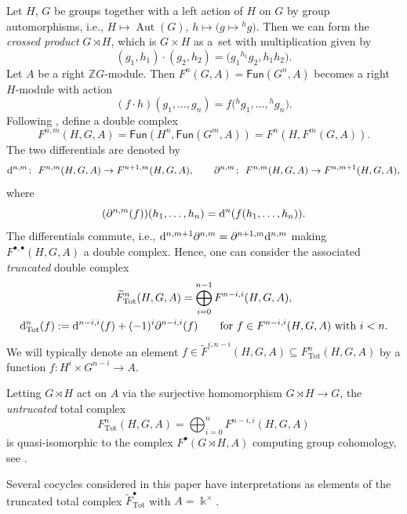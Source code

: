 \documentclass[pdftex]{sigma}
\numberwithin{equation}{section}
\newcommand{\Aut}{\operatorname{Aut}}
\newcommand{\deri}{{\rm d}}
\newcommand{\wF}{\widetilde{F}}
\newcommand{\Tot}{\mathrm{Tot}}
\newcommand{\Fun}{\mathsf{Fun}}
\newcommand{\mZ}{\mathbb{Z}}
\begin{document}
Let $H$, $G$ be groups together with a left action of $H$ on $G$ by group automorphisms, i.e., $H\mapsto \Aut(G)$, $h\mapsto \big(g\mapsto {}^hg\big)$. Then we can form the \emph{crossed product}
$G\rtimes H$, which is $G\times H$ as a~set with multiplication given by
\[(g_1,h_1)\cdot (g_2,h_2)=\big(g_1{}^{h_1}g_2,h_1h_2\big).\]
Let $A$ be a right $\mZ G$-module. Then $F^n(G,A)=\Fun(G^n,A)$ becomes a right $H$-module with action
\[(f\cdot h)(g_1,\dots, g_n)=f\big({}^hg_1,\dots, {}^hg_n\big).\]
Following \cite[Appendix~A]{DS}, define a double complex
\[F^{n,m}(H,G,A)=\Fun(H^{n},\Fun(G^m,A))=F^n(H,F^m(G,A)).\]
The two differentials are denoted by
\[\deri^{n,m}\colon\ F^{n,m}(H,G,A)\to F^{n+1,m}(H,G,A), \qquad \partial^{n,m} \colon\ F^{n,m}(H,G,A)\to F^{n,m+1}(H,G,A),\]
where
\[(\partial^{n,m}(f))(h_1,\dots, h_n)=\deri^n(f(h_1,\dots, h_n)).\]
The differentials commute, i.e., $\deri^{n,m+1}\partial^{n,m}=\partial^{n+1,m}\deri^{n,m}$ making $F^{\bullet,\bullet}(H,G,A)$ a double complex. Hence, one can consider the associated \emph{truncated} double complex
\begin{gather*}
\wF_{\Tot}^{n}(H,G,A)=\bigoplus_{i=0}^{n-1}F^{n-i,i}(H,G,A),\\
\deri_{\Tot}^n(f):=\deri^{n-i,i}(f)+(-1)^i\partial^{n-i,i}(f) \qquad \text{for $f\in F^{n-i,i}(H,G,A)$ with $i<n$}.
\end{gather*}
We will typically denote an element $f\in \wF^{i,n-i}(H,G,A)\subseteq F_{\Tot}^{n}(H,G,A)$ by a function
$f\colon H^i\times G^{n-i} \to A$.

Letting $G\rtimes H$ act on $A$ via the surjective homomorphism $G\rtimes H\to G$, the \emph{untrucated} total complex
\[F_{\Tot}^n(H,G,A)=\bigoplus_{i=0}^{n} F^{n-i,i}(H,G,A)\] is quasi-isomorphic to the complex $F^\bullet(G\rtimes H,A)$ computing group cohomology, see \cite{HS}.

Several cocycles considered in this paper have interpretations as elements of the truncated total complex $\wF_{\Tot}^{\bullet}$ with $A=\Bbbk^\times$.
\end{document}
